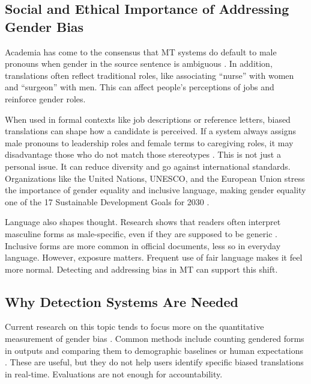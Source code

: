 \subsection{Social and Ethical Importance of Addressing Gender Bias}\label{section:social_and_ethical_importance_of_addressing}
Academia has come to the consensus that MT systems do default to male pronouns when gender in the source sentence is ambiguous \citep{pratesAssessingGenderBias2019,choMeasuringGenderBias2019,rescignoGenderBiasMachine2023}.  In addition, translations often reflect traditional roles, like associating “nurse” with women and “surgeon” with men. This can affect people’s perceptions of jobs and reinforce gender roles.

When used in formal contexts like job descriptions or reference letters, biased translations can shape how a candidate is perceived. If a system always assigns male pronouns to leadership roles and female terms to caregiving roles, it may disadvantage those who do not match those stereotypes \citep{bolukbasiManComputerProgrammer2016}. This is not just a personal issue. It can reduce diversity and go against international standards. Organizations like the United Nations, UNESCO, and the European Union stress the importance of gender equality and inclusive language, making gender equality one of the 17 Sustainable Development Goals for 2030 \citep{sczesnyCanGenderFairLanguage2016,unitednationsAchieveGenderEquality2023}. 

Language also shapes thought. Research shows that readers often interpret masculine forms as male-specific, even if they are supposed to be generic \citep{sczesnyCanGenderFairLanguage2016}. Inclusive forms are more common in official documents, less so in everyday language. However, exposure matters. Frequent use of fair language makes it feel more normal. Detecting and addressing bias in MT can support this shift.

\subsection{Why Detection Systems Are Needed}

Current research on this topic tends to focus more on the quantitative measurement of gender bias \citep{rescignoGenderBiasMachine2023,barclayInvestigatingMarkersDrivers2024a,smacchiaDoesAIReflect2024}. Common methods include counting gendered forms in outputs and comparing them to demographic baselines or human expectations \citep{rescignoGenderBiasMachine2023,pratesAssessingGenderBias2019,savoldiWhatHarmQuantifying2024}. These are useful, but they do not help users identify specific biased translations in real-time. Evaluations are not enough for accountability. 

